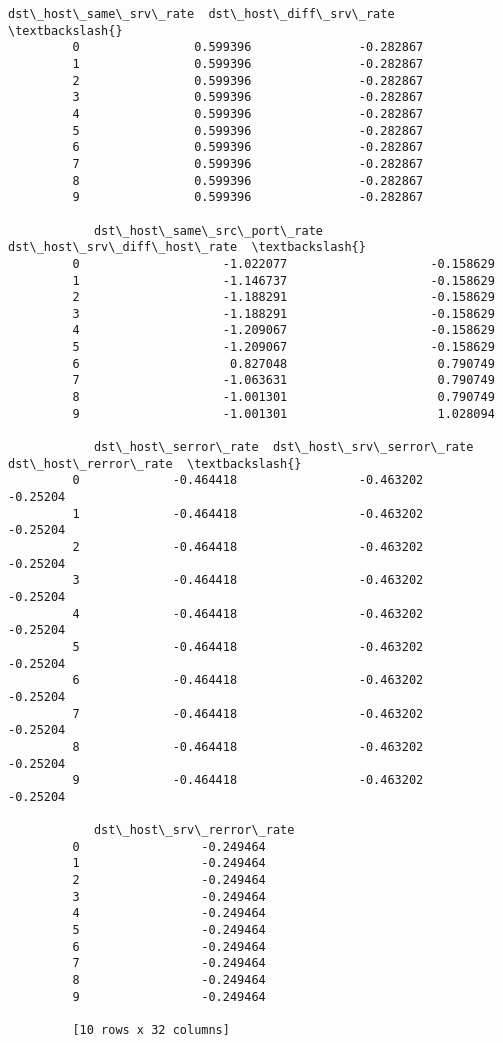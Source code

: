 \documentclass[11pt]{article}
\begin{document}
\begin{Verbatim}[commandchars=\\\{\}]
            dst\_host\_same\_srv\_rate  dst\_host\_diff\_srv\_rate  \textbackslash{}
         0                0.599396               -0.282867   
         1                0.599396               -0.282867   
         2                0.599396               -0.282867   
         3                0.599396               -0.282867   
         4                0.599396               -0.282867   
         5                0.599396               -0.282867   
         6                0.599396               -0.282867   
         7                0.599396               -0.282867   
         8                0.599396               -0.282867   
         9                0.599396               -0.282867   
         
            dst\_host\_same\_src\_port\_rate  dst\_host\_srv\_diff\_host\_rate  \textbackslash{}
         0                    -1.022077                    -0.158629   
         1                    -1.146737                    -0.158629   
         2                    -1.188291                    -0.158629   
         3                    -1.188291                    -0.158629   
         4                    -1.209067                    -0.158629   
         5                    -1.209067                    -0.158629   
         6                     0.827048                     0.790749   
         7                    -1.063631                     0.790749   
         8                    -1.001301                     0.790749   
         9                    -1.001301                     1.028094   
         
            dst\_host\_serror\_rate  dst\_host\_srv\_serror\_rate  dst\_host\_rerror\_rate  \textbackslash{}
         0             -0.464418                 -0.463202              -0.25204   
         1             -0.464418                 -0.463202              -0.25204   
         2             -0.464418                 -0.463202              -0.25204   
         3             -0.464418                 -0.463202              -0.25204   
         4             -0.464418                 -0.463202              -0.25204   
         5             -0.464418                 -0.463202              -0.25204   
         6             -0.464418                 -0.463202              -0.25204   
         7             -0.464418                 -0.463202              -0.25204   
         8             -0.464418                 -0.463202              -0.25204   
         9             -0.464418                 -0.463202              -0.25204   
         
            dst\_host\_srv\_rerror\_rate  
         0                 -0.249464  
         1                 -0.249464  
         2                 -0.249464  
         3                 -0.249464  
         4                 -0.249464  
         5                 -0.249464  
         6                 -0.249464  
         7                 -0.249464  
         8                 -0.249464  
         9                 -0.249464  
         
         [10 rows x 32 columns]
\end{Verbatim}
            
\end{document}
